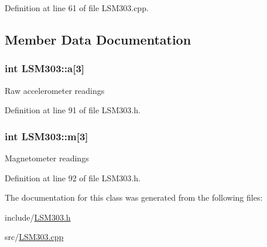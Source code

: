 \-Definition at line 61 of file \-L\-S\-M303.\-cpp.



\subsection{\-Member \-Data \-Documentation}
\hypertarget{class_l_s_m303_ad71c39fa2c1dfd978c9e93b48a6a9310}{
\subsubsection[{a}]{\setlength{\rightskip}{0pt plus 5cm}int {\bf \-L\-S\-M303\-::a}\mbox{[}3\mbox{]}}}\label{class_l_s_m303_ad71c39fa2c1dfd978c9e93b48a6a9310}
\-Raw accelerometer readings 

\-Definition at line 91 of file \-L\-S\-M303.\-h.

\hypertarget{class_l_s_m303_a606cb6a86d385c4c4a9767f6b1bf2ea5}{
\subsubsection[{m}]{\setlength{\rightskip}{0pt plus 5cm}int {\bf \-L\-S\-M303\-::m}\mbox{[}3\mbox{]}}}\label{class_l_s_m303_a606cb6a86d385c4c4a9767f6b1bf2ea5}
\-Magnetometer readings 

\-Definition at line 92 of file \-L\-S\-M303.\-h.



\-The documentation for this class was generated from the following files\-:\begin{DoxyCompactItemize}
\item 
include/\hyperlink{_l_s_m303_8h}{\-L\-S\-M303.\-h}\item 
src/\hyperlink{_l_s_m303_8cpp}{\-L\-S\-M303.\-cpp}\end{DoxyCompactItemize}
